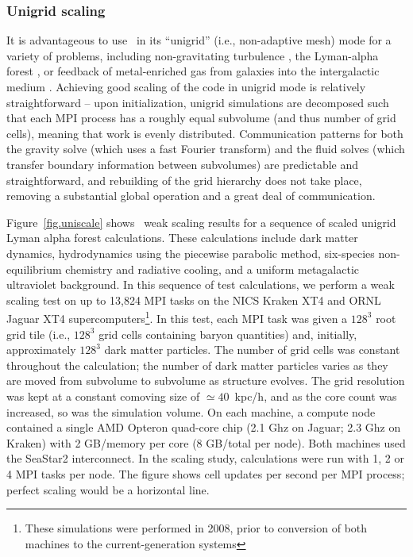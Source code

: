 \subsubsection{Unigrid scaling}

It is advantageous to use \enzo\ in its ``unigrid'' (i.e.,
non-adaptive mesh) mode for a variety of problems, including
non-gravitating turbulence
\citep[e.g.,][]{2002ApJ...569L.127K,Kritsuk04}, the Lyman-alpha forest
\citep{2005MNRAS.361...70J,2009MNRAS.399.1934P}, or feedback of
metal-enriched gas from galaxies into the intergalactic medium
\citep{2004ApJ...601L.115N,2011ApJ...731....6S}.  Achieving good
scaling of the code in unigrid mode is relatively straightforward --
upon initialization, unigrid simulations are decomposed such that each
MPI process has a roughly equal subvolume (and thus number of grid
cells), meaning that work is evenly distributed.  Communication
patterns for both the gravity solve (which uses a fast Fourier
transform) and the fluid solves (which transfer boundary information
between subvolumes) are predictable and straightforward, and
rebuilding of the grid hierarchy does not take place, removing a
substantial global operation and a great deal of communication.

Figure~\ref{fig.uniscale} shows \enzo\ weak scaling results for a
sequence of scaled unigrid Lyman alpha forest calculations. These
calculations include dark matter dynamics, hydrodynamics using the
piecewise parabolic method, six-species non-equilibrium chemistry and
radiative cooling, and a uniform metagalactic ultraviolet background.
In this sequence of test calculations, we perform a weak scaling test
on up to 13,824 MPI tasks on the NICS Kraken XT4 and ORNL Jaguar XT4
supercomputers\footnote{These simulations were performed in 2008,
prior to conversion of both machines to the current-generation
systems}.  In this test, each MPI task was given a $128^3$ root grid
tile (i.e., $128^3$ grid cells containing baryon quantities) and,
initially, approximately $128^3$ dark matter particles.  The number of
grid cells was constant throughout the calculation; the number of dark
matter particles varies as they are moved from subvolume to subvolume
as structure evolves.  The grid resolution was kept at a constant
comoving size of $\simeq 40$~kpc/h, and as the core count was
increased, so was the simulation volume.  On each machine, a compute
node contained a single AMD Opteron quad-core chip (2.1 Ghz on Jaguar;
2.3 Ghz on Kraken) with 2 GB/memory per core (8 GB/total per node).
Both machines used the SeaStar2 interconnect.  In the scaling study,
calculations were run with 1, 2 or 4 MPI tasks per node.  The figure
shows cell updates per second per MPI process; perfect scaling would
be a horizontal line.

